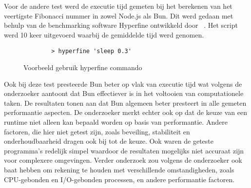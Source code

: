 Voor de andere test werd de executie tijd gemeten bij het berekenen van het veertigste Fibonacci nummer in zowel Node.js als Bun. 
Dit werd gedaan met behulp van de benchmarking software Hyperfine ontwikkeld door ~\textcite{Pompeii2024}. 
Het script werd 10 keer uitgevoerd waarbij de gemiddelde tijd werd genomen.
\begin{figure}[H]
    \centering
    \begin{verbatim}
        > hyperfine 'sleep 0.3'
        \end{verbatim}
        \caption{Voorbeeld gebruik hyperfine commando \autocite{Pompeii2024}}
\end{figure}
Ook bij deze test presteerde Bun beter op vlak van executie tijd wat volgens de onderzoeker aantoont dat Bun effectiever is in het voltooien van computationele taken.
De resultaten tonen aan dat 
Bun algemeen beter presteert in alle gemeten performantie aspecten.
De onderzoeker merkt echter ook op dat de keuze van een runtime niet alleen kan bepaald worden op basis van 
performantie. Andere factoren, die hier niet getest zijn, zoals beveiling, stabiliteit en onderhoudbaarheid dragen ook bij tot de keuze. 
Ook waren de geteste programma's redelijk simpel waardoor de resultaten mogelijks niet accuraat zijn voor complexere omgevingen. 
Verder onderzoek zou volgens de onderzoeker ook baat hebben om rekening te houden met verschillende omstandigheden, zoals CPU-gebonden
en I/O-gebonden processen, en andere performantie factoren.